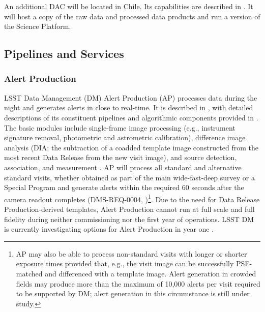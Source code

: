 An additional DAC will be located in Chile.
Its capabilities are described in .
It will host a copy of the raw data and processed data products and run a version of the Science Platform.

\subsection{Pipelines and Services}

\subsubsection{Alert Production}\label{sec:AP}

LSST Data Management (DM) Alert Production (AP) processes data during the night and generates alerts in close to real-time.
It is described in , with detailed descriptions of its constituent pipelines and algorithmic components provided in .
The basic modules include single-frame image processing (e.g., instrument signature removal, photometric and astrometric calibration), difference image analysis (DIA; the subtraction of a coadded template image constructed from the most recent Data Release from the new visit image), and source detection, association, and measurement .
AP will process all standard and alternative standard visits, whether obtained as part of the main wide-fast-deep survey or a Special Program  and generate alerts within the required 60 seconds after the camera readout completes (DMS-REQ-0004, )\footnote{
AP may also be able to process non-standard visits with longer or shorter exposure times provided that, e.g., the visit image can be successfully PSF-matched and differenced with a template image.
Alert generation in crowded fields may produce more than the maximum of 10,000 alerts per visit required to be supported by DM; alert generation in this circumstance is still under study.
}.
Due to the need for Data Release Production-derived templates, Alert Production cannot run at full scale and full fidelity during neither commissioning nor the first year of operations.  LSST DM is currently investigating options for Alert Production in year one .

